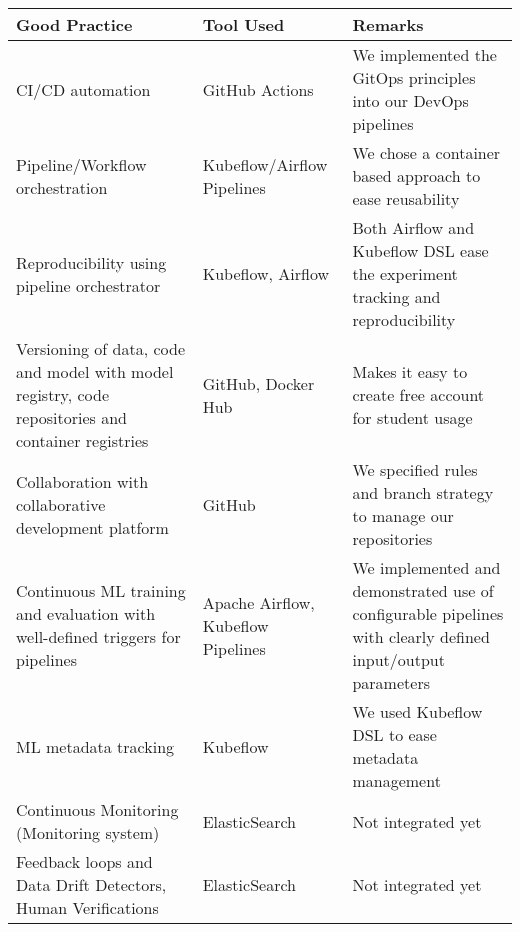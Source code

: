 \footnotesize
\begin{longtable}{|p{5cm}|p{4cm}|p{8cm}|}
    \hline
    \textbf{Good Practice} & \textbf{Tool Used} & \textbf{Remarks}\\
    \hline
    CI/CD automation & GitHub Actions & We implemented the GitOps principles into our DevOps pipelines \\
    \hline
    Pipeline/Workflow orchestration & Kubeflow/Airflow Pipelines & We chose a container based approach to ease reusability \\
    \hline
    Reproducibility using pipeline orchestrator & Kubeflow, Airflow &  Both Airflow and Kubeflow DSL ease the experiment tracking and reproducibility \\
    \hline
    Versioning of data, code and model with model registry, code repositories and container registries & GitHub, Docker Hub & Makes it easy to create free account for student usage\\
    \hline
    Collaboration with collaborative development platform & GitHub & We specified rules and branch strategy to manage our repositories \\
    \hline
    Continuous ML training and evaluation with well-defined triggers for pipelines & Apache Airflow, Kubeflow Pipelines & We implemented and demonstrated use of configurable pipelines with clearly defined input/output parameters\\
    \hline
    ML metadata tracking & Kubeflow & We used Kubeflow DSL to ease metadata management\\
    \hline
    Continuous Monitoring (Monitoring system) & ElasticSearch & Not integrated yet\\
    \hline
    Feedback loops and Data Drift Detectors, Human Verifications & ElasticSearch & Not integrated yet\\
    \hline
\end{longtable}
\normalsize
